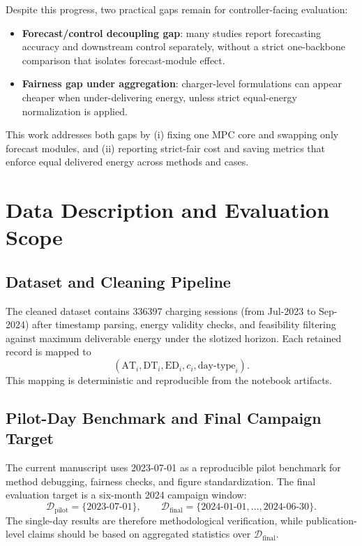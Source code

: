 \documentclass[journal]{IEEEtran}
\newcommand{\AT}{\mathrm{AT}}
\newcommand{\DT}{\mathrm{DT}}
\newcommand{\ED}{\mathrm{ED}}
\begin{document}
Despite this progress, two practical gaps remain for controller-facing evaluation:
\begin{itemize}
    \item \textbf{Forecast/control decoupling gap}: many studies report forecasting accuracy and downstream control separately, without a strict one-backbone comparison that isolates forecast-module effect.
    \item \textbf{Fairness gap under aggregation}: charger-level formulations can appear cheaper when under-delivering energy, unless strict equal-energy normalization is applied.
\end{itemize}

This work addresses both gaps by (i) fixing one MPC core and swapping only forecast modules, and (ii) reporting strict-fair cost and saving metrics that enforce equal delivered energy across methods and cases.

\section{Data Description and Evaluation Scope}

\subsection{Dataset and Cleaning Pipeline}
The cleaned dataset contains \num{336397} charging sessions (from Jul-2023 to Sep-2024) after timestamp parsing, energy validity checks, and feasibility filtering against maximum deliverable energy under the slotized horizon. Each retained record is mapped to
\begin{equation}
(\AT_i,\DT_i,\ED_i,c_i,\text{day-type}_i).
\end{equation}
This mapping is deterministic and reproducible from the notebook artifacts.

\subsection{Pilot-Day Benchmark and Final Campaign Target}
The current manuscript uses 2023-07-01 as a reproducible pilot benchmark for method debugging, fairness checks, and figure standardization. The final evaluation target is a six-month 2024 campaign window:
\begin{equation}
\mathcal{D}_{\mathrm{pilot}}=\{\text{2023-07-01}\},\qquad
\mathcal{D}_{\mathrm{final}}=\{\text{2024-01-01},\dots,\text{2024-06-30}\}.
\end{equation}
The single-day results are therefore methodological verification, while publication-level claims should be based on aggregated statistics over $\mathcal{D}_{\mathrm{final}}$.
\end{document}
